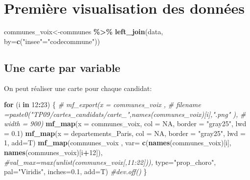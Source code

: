 \documentclass[
]{book}
\newenvironment{Shaded}{\begin{snugshade}}{\end{snugshade}}
\newcommand{\AttributeTok}[1]{\textcolor[rgb]{0.13,0.29,0.53}{#1}}
\newcommand{\CommentTok}[1]{\textcolor[rgb]{0.56,0.35,0.01}{\textit{#1}}}
\newcommand{\ConstantTok}[1]{\textcolor[rgb]{0.56,0.35,0.01}{#1}}
\newcommand{\ControlFlowTok}[1]{\textcolor[rgb]{0.13,0.29,0.53}{\textbf{#1}}}
\newcommand{\DecValTok}[1]{\textcolor[rgb]{0.00,0.00,0.81}{#1}}
\newcommand{\FloatTok}[1]{\textcolor[rgb]{0.00,0.00,0.81}{#1}}
\newcommand{\FunctionTok}[1]{\textcolor[rgb]{0.13,0.29,0.53}{\textbf{#1}}}
\newcommand{\NormalTok}[1]{#1}
\newcommand{\OtherTok}[1]{\textcolor[rgb]{0.56,0.35,0.01}{#1}}
\newcommand{\SpecialCharTok}[1]{\textcolor[rgb]{0.81,0.36,0.00}{\textbf{#1}}}
\newcommand{\StringTok}[1]{\textcolor[rgb]{0.31,0.60,0.02}{#1}}
\begin{document}
\hypertarget{premiuxe8re-visualisation-des-donnuxe9es}{%
\section{Première visualisation des données}\label{premiuxe8re-visualisation-des-donnuxe9es}}

\begin{Shaded}
\begin{Highlighting}[]
\NormalTok{communes\_voix}\OtherTok{\textless{}{-}}\NormalTok{communes }\SpecialCharTok{\%\textgreater{}\%}
  \FunctionTok{left\_join}\NormalTok{(data, }\AttributeTok{by=}\FunctionTok{c}\NormalTok{(}\StringTok{"insee"}\OtherTok{=}\StringTok{"codecommune"}\NormalTok{))}
\end{Highlighting}
\end{Shaded}

\hypertarget{une-carte-par-variable}{%
\subsection{Une carte par variable}\label{une-carte-par-variable}}

On peut réaliser une carte pour chaque candidat:

\begin{Shaded}
\begin{Highlighting}[]
\ControlFlowTok{for}\NormalTok{ (i }\ControlFlowTok{in} \DecValTok{12}\SpecialCharTok{:}\DecValTok{23}\NormalTok{) \{}
  \CommentTok{\# mf\_export(x = communes\_voix ,}
  \CommentTok{\#           filename =paste0("TP09/cartes\_candidats/carte\_",names(communes\_voix)[i],".png" ),}
  \CommentTok{\#           width = 900)}
  \FunctionTok{mf\_map}\NormalTok{(}\AttributeTok{x =}\NormalTok{ communes\_voix, }\AttributeTok{col =} \ConstantTok{NA}\NormalTok{, }\AttributeTok{border =} \StringTok{"gray25"}\NormalTok{, }\AttributeTok{lwd =} \FloatTok{0.1}\NormalTok{)}
  \FunctionTok{mf\_map}\NormalTok{(}\AttributeTok{x =}\NormalTok{ departements\_Paris, }\AttributeTok{col =} \ConstantTok{NA}\NormalTok{, }\AttributeTok{border =} \StringTok{"gray25"}\NormalTok{, }\AttributeTok{lwd =} \DecValTok{1}\NormalTok{, }\AttributeTok{add=}\NormalTok{T)}
  \FunctionTok{mf\_map}\NormalTok{(communes\_voix ,}
         \AttributeTok{var=} \FunctionTok{c}\NormalTok{(}\FunctionTok{names}\NormalTok{(communes\_voix)[i], }\FunctionTok{names}\NormalTok{(communes\_voix)[i}\SpecialCharTok{+}\DecValTok{12}\NormalTok{]),}
         \CommentTok{\#val\_max=max(unlist(communes\_voix[,11:22])),}
         \AttributeTok{type=}\StringTok{"prop\_choro"}\NormalTok{,}
         \AttributeTok{pal=}\StringTok{"Viridis"}\NormalTok{,}
         \AttributeTok{inches=}\FloatTok{0.1}\NormalTok{,}
         \AttributeTok{add=}\NormalTok{T)}
  \CommentTok{\#dev.off()}
\NormalTok{\}}
\end{Highlighting}
\end{Shaded}
\end{document}
